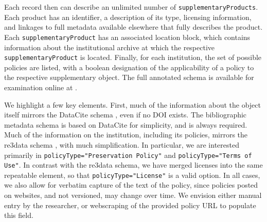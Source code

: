 Each record then can describe an unlimited number of \texttt{supplementaryProducts}.  Each product has an identifier, a description of its type, licensing information, and linkages to full metadata available elsewhere that fully describes the product.  Each \texttt{supplementaryProduct} has an associated location block, which contains information about the institutional archive at which the respective \texttt{supplementaryProduct} is located.  Finally, for each institution, the set of possible policies are listed, with a boolean designation of the applicability of a policy to the respective supplementary object.   
The full annotated schema is available for examination online at 
\iftoggle{blind}{[URL blinded - please contact JOURNAL]}{\href{https://github.com/labordynamicsinstitute/metajelo}{github.com/labordynamicsinstitute/metajelo}}.


We highlight a few key elements. First, much of the information about the object itself mirrors the DataCite schema \parencite{DataCiteMetadataWorkingGroupDataCiteMetadataSchema2017,DataCiteMetadataWorkingGroupDataCiteMetadataSchema2017a}, even if no \ac{DOI} exists. The bibliographic metadata schema is based on DataCite for simplicity, and is always required. Much of the information on the institution, including its policies, mirrors the re3data schema \parencite{Re3data.Orgre3dataorgMetadata2015,RucknagelMetadataSchemaDescription2015}, with much simplification. In particular, we are interested primarily in \texttt{policyType="Preservation Policy"} and \texttt{policyType="Terms of Use"}. In contrast with the re3data schema, we have merged licenses into the same repeatable element, so that \texttt{policyType="License"} is a valid option. In all cases, we also allow for verbatim capture of the text of the policy, since policies posted on websites, and not versioned, may change over time. We envision either manual entry by the researcher, or webscraping of the provided policy {URL} to populate this field.